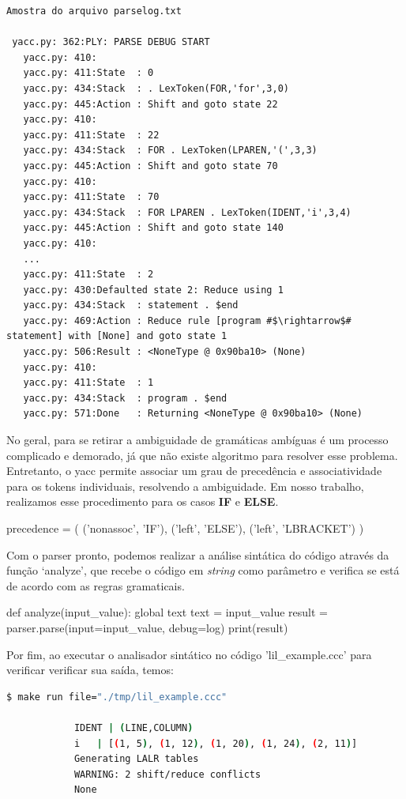 \documentclass[
	12pt,				%
	openright,			%
	twoside,			%
	a4paper,			%
	english,			%
	french,				%
	spanish,			%
	brazil				%
	]{abntex2}
\begin{document}
\begin{lstlisting}
Amostra do arquivo parselog.txt

 yacc.py: 362:PLY: PARSE DEBUG START
   yacc.py: 410:
   yacc.py: 411:State  : 0
   yacc.py: 434:Stack  : . LexToken(FOR,'for',3,0)
   yacc.py: 445:Action : Shift and goto state 22
   yacc.py: 410:
   yacc.py: 411:State  : 22
   yacc.py: 434:Stack  : FOR . LexToken(LPAREN,'(',3,3)
   yacc.py: 445:Action : Shift and goto state 70
   yacc.py: 410:
   yacc.py: 411:State  : 70
   yacc.py: 434:Stack  : FOR LPAREN . LexToken(IDENT,'i',3,4)
   yacc.py: 445:Action : Shift and goto state 140
   yacc.py: 410:
   ... 
   yacc.py: 411:State  : 2
   yacc.py: 430:Defaulted state 2: Reduce using 1
   yacc.py: 434:Stack  : statement . $end
   yacc.py: 469:Action : Reduce rule [program #$\rightarrow$# statement] with [None] and goto state 1
   yacc.py: 506:Result : <NoneType @ 0x90ba10> (None)
   yacc.py: 410:
   yacc.py: 411:State  : 1
   yacc.py: 434:Stack  : program . $end
   yacc.py: 571:Done   : Returning <NoneType @ 0x90ba10> (None)

\end{lstlisting}

No geral, para se retirar a ambiguidade de gramáticas ambíguas é um processo complicado e demorado,
já que não existe algoritmo para resolver esse problema. Entretanto, o yacc permite associar
um grau de precedência e associatividade para os tokens individuais, resolvendo 
a ambiguidade. Em nosso trabalho, realizamos esse procedimento para os casos \textbf{IF} e \textbf{ELSE}.

\begin{python}
precedence = (
    ('nonassoc', 'IF'), 
    ('left', 'ELSE'),
    ('left', 'LBRACKET')
)
\end{python}
Com o parser pronto, podemos realizar a análise sintática do código através
da função `analyze', que recebe o código em \emph{string} como parâmetro e verifica se
está de acordo com as regras gramaticais.
\begin{python}
def analyze(input_value):
    global text
    text = input_value
    result = parser.parse(input=input_value, debug=log)
    print(result)
\end{python}
Por fim, ao executar o analisador sintático no código 'lil\_example.ccc' para verificar
verificar sua saída, temos:

\begin{lstlisting}[language=bash]
            $ make run file="./tmp/lil_example.ccc"

            IDENT | (LINE,COLUMN)                                                                                       
            i   | [(1, 5), (1, 12), (1, 20), (1, 24), (2, 11)]                                                        
            Generating LALR tables
            WARNING: 2 shift/reduce conflicts
            None
\end{lstlisting}
\end{document}
